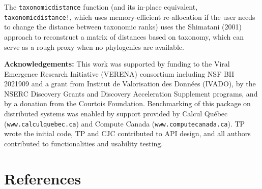 \documentclass[10pt,oneside]{article}
\begin{document}
The \texttt{taxonomicdistance} function (and its in-place equivalent,
\texttt{taxonomicdistance!}, which uses memory-efficient re-allocation
if the user needs to change the distance between taxonomic ranks) uses
the Shimatani (2001) approach to reconstruct a matrix of distances based
on taxonomy, which can serve as a rough proxy when no phylogenies are
available.

\textbf{Acknowledgements:} This work was supported by funding to the
Viral Emergence Research Initiative (VERENA) consortium including NSF
BII 2021909 and a grant from Institut de Valorisation des Données
(IVADO), by the NSERC Discovery Grants and Discovery Acceleration
Supplement programs, and by a donation from the Courtois Foundation.
Benchmarking of this package on distributed systems was enabled by
support provided by Calcul Québec (\texttt{www.calculquebec.ca}) and
Compute Canada (\texttt{www.computecanada.ca}). TP wrote the initial
code, TP and CJC contributed to API design, and all authors contributed
to functionalities and usability testing.

\hypertarget{references}{%
\section*{References}\label{references}}
\end{document}
